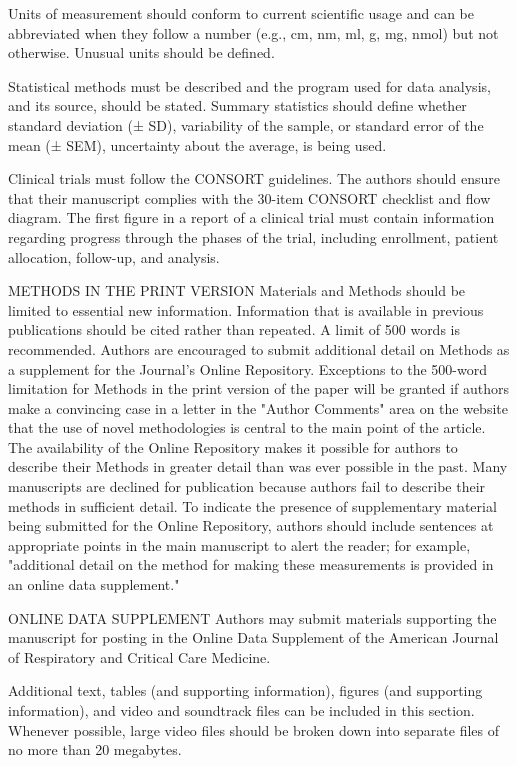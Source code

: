 Units of measurement should conform to current scientific usage and can be abbreviated when they follow a number (e.g., cm, nm, ml, g, mg, nmol) but not otherwise. Unusual units should be defined.

Statistical methods must be described and the program used for data analysis, and its source, should be stated. Summary statistics should define whether standard deviation (± SD), variability of the sample, or standard error of the mean (± SEM), uncertainty about the average, is being used.

Clinical trials must follow the CONSORT guidelines. The authors should ensure that their manuscript complies with the 30-item CONSORT checklist and flow diagram. The first figure in a report of a clinical trial must contain information regarding progress through the phases of the trial, including enrollment, patient allocation, follow-up, and analysis.

METHODS IN THE PRINT VERSION
Materials and Methods should be limited to essential new information. Information that is available in previous publications should be cited rather than repeated. A limit of 500 words is recommended. Authors are encouraged to submit additional detail on Methods as a supplement for the Journal's Online Repository. Exceptions to the 500-word limitation for Methods in the print version of the paper will be granted if authors make a convincing case in a letter in the "Author Comments" area on the website that the use of novel methodologies is central to the main point of the article. The availability of the Online Repository makes it possible for authors to describe their Methods in greater detail than was ever possible in the past. Many manuscripts are declined for publication because authors fail to describe their methods in sufficient detail. To indicate the presence of supplementary material being submitted for the Online Repository, authors should include sentences at appropriate points in the main manuscript to alert the reader; for example, "additional detail on the method for making these measurements is provided in an online data supplement."

ONLINE DATA SUPPLEMENT
Authors may submit materials supporting the manuscript for posting in the Online Data Supplement of the American Journal of Respiratory and Critical Care Medicine.

Additional text, tables (and supporting information), figures (and supporting information), and video and soundtrack files can be included in this section. Whenever possible, large video files should be broken down into separate files of no more than 20 megabytes.

